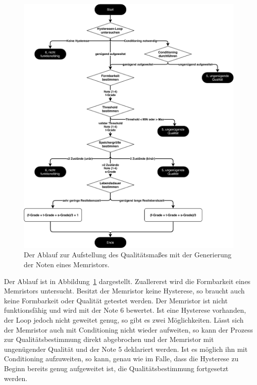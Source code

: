 \begin{figure}
  \centering
  \includegraphics[width=\textwidth]{images/Notengeneration.pdf}
  \caption{Der Ablauf zur Aufstellung des Qualitätsmaßes mit der Generierung der Noten eines Memristors.}
  \label{fig:Notengenerierung}
\end{figure}

Der Ablauf ist in Abbildung~\ref{fig:Notengenerierung} dargestellt. Zuallererst wird die Formbarkeit eines Memristors untersucht. Besitzt der Memristor keine Hysterese, so braucht auch keine Formbarkeit oder Qualität getestet werden. Der Memristor ist nicht funktionsfähig und wird mit der Note 6 bewertet. Ist eine Hysterese vorhanden, der Loop jedoch nicht geweitet genug, so gibt es zwei Möglichkeiten. Lässt sich der Memristor auch mit Conditioning nicht wieder aufweiten, so kann der Prozess zur Qualitätsbestimmung direkt abgebrochen und der Memristor mit ungenügender Qualität und der Note 5 deklariert werden. Ist es möglich ihn mit Conditioning aufzuweiten, so kann, genau wie im Falle, dass die Hysterese zu Beginn bereits genug aufgeweitet ist, die Qualitätsbestimmung fortgesetzt werden.

